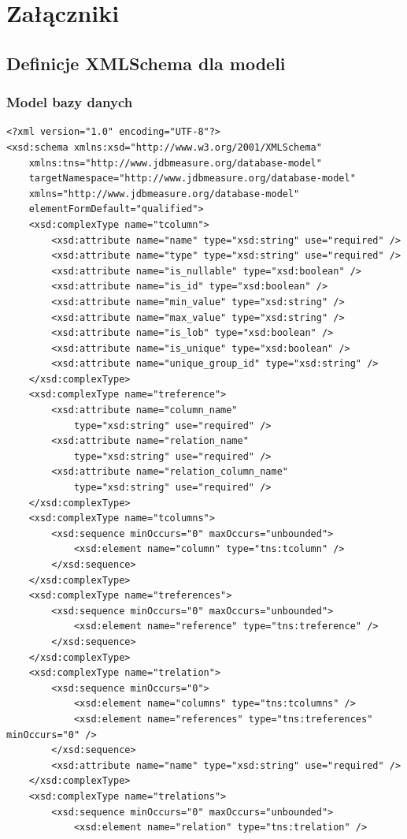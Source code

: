 \chapter{Załączniki}

\section{Definicje XMLSchema dla modeli}
\subsection{Model bazy danych}
\begin{Verbatim}
<?xml version="1.0" encoding="UTF-8"?>
<xsd:schema xmlns:xsd="http://www.w3.org/2001/XMLSchema"
	xmlns:tns="http://www.jdbmeasure.org/database-model"
	targetNamespace="http://www.jdbmeasure.org/database-model"
	xmlns="http://www.jdbmeasure.org/database-model"
	elementFormDefault="qualified">
	<xsd:complexType name="tcolumn">
		<xsd:attribute name="name" type="xsd:string" use="required" />
		<xsd:attribute name="type" type="xsd:string" use="required" />
		<xsd:attribute name="is_nullable" type="xsd:boolean" />
		<xsd:attribute name="is_id" type="xsd:boolean" />
		<xsd:attribute name="min_value" type="xsd:string" />
		<xsd:attribute name="max_value" type="xsd:string" />
		<xsd:attribute name="is_lob" type="xsd:boolean" />
		<xsd:attribute name="is_unique" type="xsd:boolean" />
		<xsd:attribute name="unique_group_id" type="xsd:string" />
	</xsd:complexType>
	<xsd:complexType name="treference">
		<xsd:attribute name="column_name" 
			type="xsd:string" use="required" />
		<xsd:attribute name="relation_name" 
			type="xsd:string" use="required" />
		<xsd:attribute name="relation_column_name" 
			type="xsd:string" use="required" />
	</xsd:complexType>
	<xsd:complexType name="tcolumns">
		<xsd:sequence minOccurs="0" maxOccurs="unbounded">
			<xsd:element name="column" type="tns:tcolumn" />
		</xsd:sequence>
	</xsd:complexType>
	<xsd:complexType name="treferences">
		<xsd:sequence minOccurs="0" maxOccurs="unbounded">
			<xsd:element name="reference" type="tns:treference" />
		</xsd:sequence>
	</xsd:complexType>
	<xsd:complexType name="trelation">
		<xsd:sequence minOccurs="0">
			<xsd:element name="columns" type="tns:tcolumns" />
			<xsd:element name="references" type="tns:treferences" minOccurs="0" />
		</xsd:sequence>
		<xsd:attribute name="name" type="xsd:string" use="required" />
	</xsd:complexType>
	<xsd:complexType name="trelations">
		<xsd:sequence minOccurs="0" maxOccurs="unbounded">
			<xsd:element name="relation" type="tns:trelation" />

\end{Verbatim}
